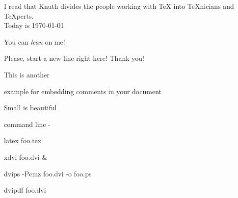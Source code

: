 \documentclass{article}
\begin{document}

I read that Knuth divides the people working with 
\TeX{} into \TeX{}nicians and \TeX perts. \\
Today is \today

You can \textsl{lean} on me!

Please, start
a new line right here!\newline
Thank you!



%
This is another 
\begin{comment}
rather stupid,
but helpful
\end{comment}
example for embedding
comments in your document


%


Small is beautiful



command line - 

latex foo.tex

xdvi foo.dvi \&

dvips -Pcmz foo.dvi -o foo.ps

dvipdf foo.dvi


\end{document}
